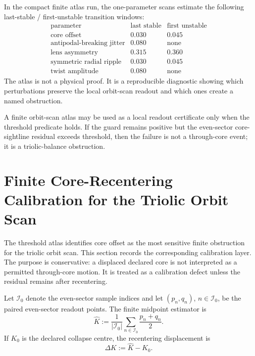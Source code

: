 \begin{remark}
In the compact finite atlas run, the one-parameter scans estimate the following
last-stable / first-unstable transition windows:
\[
\begin{array}{c|c|c}
\text{parameter} & \text{last stable} & \text{first unstable}\\
\hline
\text{core offset} & 0.030 & 0.045\\
\text{antipodal-breaking jitter} & 0.080 & \text{none}\\
\text{lens asymmetry} & 0.315 & 0.360\\
\text{symmetric radial ripple} & 0.030 & 0.045\\
\text{twist amplitude} & 0.080 & \text{none}
\end{array}
\]
The atlas is not a physical proof.  It is a reproducible diagnostic showing
which perturbations preserve the local orbit-scan readout and which ones create
a named obstruction.
\end{remark}

\begin{theorem}
A finite orbit-scan atlas may be used as a local readout certificate only when
the threshold predicate holds.  If the guard remains positive but the
even-sector core-sightline residual exceeds threshold, then the failure is not a
through-core event; it is a triolic-balance obstruction.
\end{theorem}



\section{Finite Core-Recentering Calibration for the Triolic Orbit Scan}
\label{sec:finite-core-recentering-calibration}

The threshold atlas identifies core offset as the most sensitive finite
obstruction for the triolic orbit scan.  This section records the corresponding
calibration layer.  The purpose is conservative: a displaced declared core is
not interpreted as a permitted through-core motion.  It is treated as a
calibration defect unless the residual remains after recentering.

Let \(\mathcal I_0\) denote the even-sector sample indices and let
\((p_n,q_n)\), \(n\in\mathcal I_0\), be the paired even-sector readout points.
The finite midpoint estimator is
\[
    \widehat K
    :=
    \frac1{|\mathcal I_0|}
    \sum_{n\in\mathcal I_0} \frac{p_n+q_n}{2} .
\]
If \(K_0\) is the declared collapse centre, the recentering displacement is
\[
    \Delta K := \widehat K-K_0 .
\]

